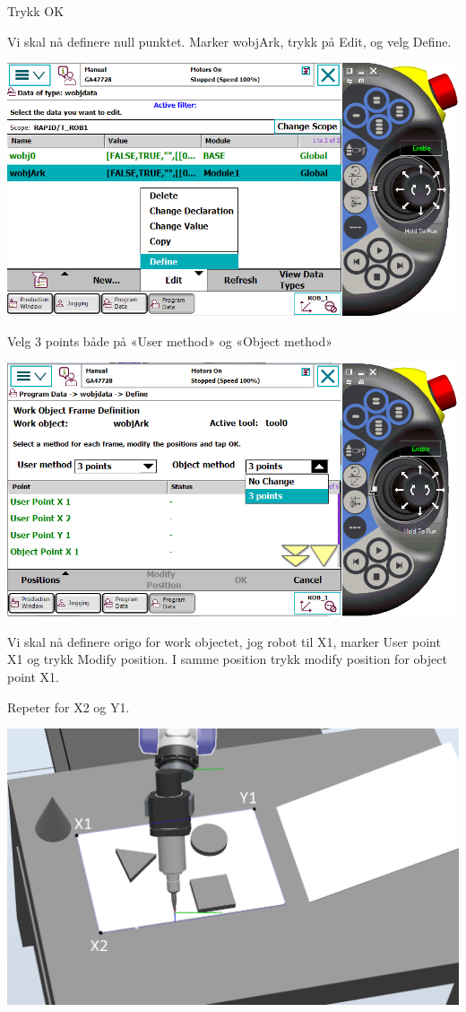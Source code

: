 Trykk OK 

Vi skal nå definere null punktet. Marker wobjArk, trykk på Edit, og
velg Define.

\includegraphics[width=1\textwidth]{i04861x17}

Velg 3 points både på «User method» og «Object method»

\includegraphics[width=1\textwidth]{i04861x18}

Vi skal nå definere origo for work objectet, jog robot til X1, marker User point X1 og trykk Modify position. I samme position trykk modify position for object point X1.

Repeter for X2 og Y1.

\includegraphics[width=1\textwidth]{i04861x19}

